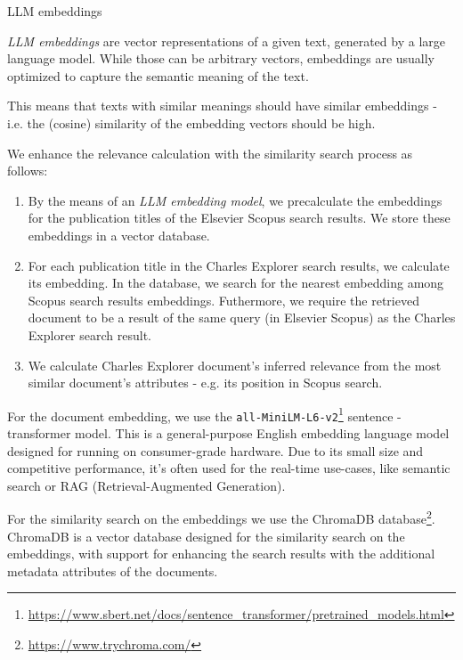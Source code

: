 \begin{mybox}{LLM embeddings}

    \textit{LLM embeddings} are vector representations of a given text, generated by a large language model.
    While those can be arbitrary vectors, embeddings are usually optimized to capture the semantic meaning of the text. 
    
    This means that texts with similar meanings should have similar embeddings - i.e. the (cosine) similarity of the embedding vectors should be high.
\end{mybox}

We enhance the relevance calculation with the similarity search process as follows:

\begin{enumerate}
    \item By the means of an \textit{LLM embedding model}, we precalculate the embeddings for the publication titles of the Elsevier Scopus search results. 
    We store these embeddings in a vector database.
    \item For each publication title in the Charles Explorer search results, we calculate its embedding. 
    In the database, we search for the nearest embedding among Scopus search results embeddings. 
    Futhermore, we require the retrieved document to be a result of the same query (in Elsevier Scopus) as the Charles Explorer search result.
    \item We calculate Charles Explorer document’s inferred relevance from the most similar document’s attributes - e.g. its position in Scopus search.
\end{enumerate}

For the document embedding, we use the \texttt{all-MiniLM-L6-v2}\footnote{\url{https://www.sbert.net/docs/sentence_transformer/pretrained_models.html}} sentence - transformer model. 
This is a general-purpose English embedding language model designed for running on consumer-grade hardware. 
Due to its small size and competitive performance, it’s often used for the real-time use-cases, like semantic search or RAG (Retrieval-Augmented Generation).

For the similarity search on the embeddings we use the ChromaDB database\footnote{\url{https://www.trychroma.com/}}. 
ChromaDB is a vector database designed for the similarity search on the embeddings, with support
for enhancing the search results with the additional metadata attributes of the documents.

\newpage

